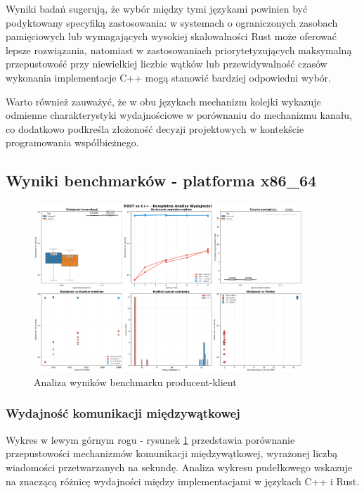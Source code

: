Wyniki badań sugerują, że wybór między tymi językami powinien być podyktowany specyfiką zastosowania: w systemach o ograniczonych zasobach pamięciowych lub wymagających wysokiej skalowalności Rust może oferować lepsze rozwiązania, natomiast w zastosowaniach priorytetyzujących maksymalną przepustowość przy niewielkiej liczbie wątków lub przewidywalność czasów wykonania implementacje C++ mogą stanowić bardziej odpowiedni wybór.

Warto również zauważyć, że w obu językach mechanizm kolejki wykazuje odmienne charakterystyki wydajnościowe w porównaniu do mechanizmu kanału, co dodatkowo podkreśla złożoność decyzji projektowych w kontekście programowania współbieżnego.
\subsection{Wyniki benchmarków - platforma x86\_64}
\begin{figure}[H]
    \centering
    \includegraphics[width=0.9\textwidth]{analiza/images/conc/pc/x86/mega_overview_2x3.png}
    \caption{Analiza wyników benchmarku producent-klient}
    \label{analiza_benchmarku_producent_klient_x86_64}
\end{figure}

\subsubsection{Wydajność komunikacji międzywątkowej}
Wykres w lewym górnym rogu - rysunek \ref{analiza_benchmarku_producent_klient_x86_64} przedstawia porównanie przepustowości mechanizmów komunikacji międzywątkowej, wyrażonej liczbą wiadomości przetwarzanych na sekundę. Analiza wykresu pudełkowego wskazuje na znaczącą różnicę wydajności między implementacjami w językach C++ i Rust.


